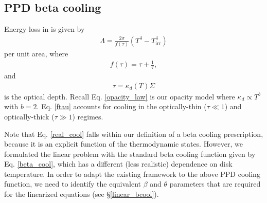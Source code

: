\subsection{PPD beta cooling}\label{ppd_cooling}
Energy loss in  is given by 
\begin{align}\label{real_cool}
  \Lambda = \frac{2\sigma}{f(\tau)}\left(T^4 - T_\mathrm{irr}^4\right)
\end{align}
per unit area, where
\begin{align}
  f(\tau) = \tau + \frac{1}{\tau}, \label{ftau} 
\end{align}
and
\begin{align}
  \tau = \kappa_d(T)\Sigma
\end{align}
is the optical depth. Recall Eq. \ref{opacity_law} 
is our opacity model where $\kappa_d\propto T^b$ with $b=2$. 
Eq. \ref{ftau} accounts for cooling in the optically-thin ($\tau\ll
1$) and optically-thick ($\tau\gg1$) regimes. 

Note that Eq. \ref{real_cool} falls within our definition of a beta
cooling prescription, because 
it is an explicit function of the thermodynamic states. However, we
formulated the linear problem with the standard beta cooling function 
given by Eq. \ref{beta_cool}, which has a different (less realistic)
dependence on disk temperature. 
 In order to adapt the existing  framework to the above PPD cooling function, we 
need to identify the equivalent $\beta$ and $\theta$ parameters that are required for the 
linearized equations (see \S\ref{linear_bcool}). 
 

